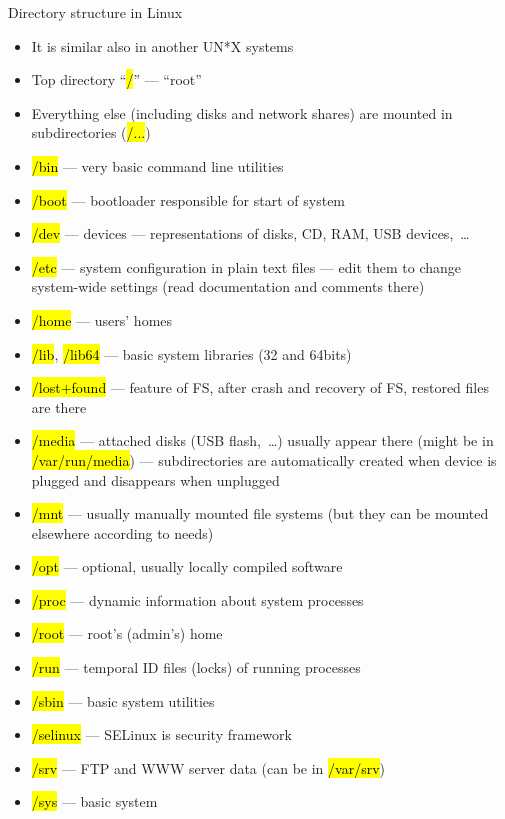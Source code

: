 \documentclass[compress, ucs, xelatex, 11pt, xcolor=svgnames,
  hyperref={
    bookmarks=true,
    unicode=true,
    colorlinks=true,
    pdftitle={Linux, command line and MetaCentrum},
    plainpages=false,
    pdfauthor={Vojtech Zeisek},
    pdfsubject={Course about use of Linux command line, writing shell scripts and using MetaCentrum of CESNET},
    pdfcreator={XeLaTeX},
    pdfkeywords={Linux, GNU, BASH, shell, command line, MetaCentrum},
    linkcolor=DarkRed,
    anchorcolor=DarkBlue,
    citecolor=Indigo,
    filecolor=NavyBlue,
    menucolor=DarkMagenta,
    urlcolor=DarkBlue,
    pdftex},
  url={hyphens, lowtilde} %
  ]{beamer}
\renewcommand{\texttt}[1]{\hl{\ttfamily #1}}
\renewcommand{\alert}[1]{\textcolor{red}{#1}}
\begin{document}
\begin{frame}[allowframebreaks]{Directory structure in Linux}
  \begin{itemize}
    \item It is similar also in another UN*X systems
    \item Top directory ``\texttt{/}'' --- ``root''
    \item Everything else (including disks and network shares) are mounted in subdirectories (\texttt{/...})
    \item \texttt{/bin} --- very basic command line utilities
    \item \texttt{/boot} --- bootloader responsible for start of system
    \item \texttt{/dev} --- devices --- representations of disks, CD, RAM, USB devices,~\ldots
    \item \alert{\texttt{/etc}} --- system configuration in plain text files --- edit them to change system-wide settings (read documentation and comments there)
    \item \alert{\texttt{/home}} --- users' homes
    \item \texttt{/lib}, \texttt{/lib64} --- basic system libraries (32 and 64bits)
    \item \texttt{/lost+found} --- feature of FS, after crash and recovery of FS, restored files are there
    \item \alert{\texttt{/media}} --- attached disks (USB flash,~\ldots) usually appear there (might be in \texttt{/var/run/media}) --- subdirectories are automatically created when device is plugged and disappears when unplugged
    \item \texttt{/mnt} --- usually manually mounted file systems (but they can be mounted elsewhere according to needs)
    \item \texttt{/opt} --- optional, usually locally compiled software
    \item \texttt{/proc} --- dynamic information about system processes
    \item \texttt{/root} --- root's (admin's) home
    \item \texttt{/run} --- temporal ID files (locks) of running processes
    \item \texttt{/sbin} --- basic system utilities
    \item \texttt{/selinux} --- SELinux is security framework
    \item \texttt{/srv} --- FTP and WWW server data (can be in \texttt{/var/srv})
    \item \texttt{/sys} --- basic system

\end{itemize}
\end{frame}
\end{document}
